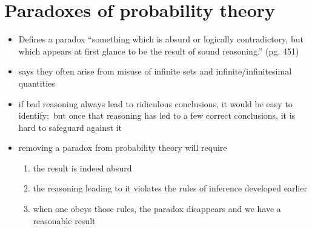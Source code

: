 \documentclass[../jaynes_prob_theory_notes.tex]{subfiles}
\begin{document}
    \section{Paradoxes of probability theory}
        \begin{itemize} 
            \item Defines a paradox ``something which is absurd or logically contradictory, but which appears at first glance to be the result of sound reasoning.'' (pg. 451)
            \item says they often arise from misuse of infinite sets and infinite/infinitesimal quantities
            \item if bad reasoning always lead to ridiculous conclusions, it would be easy to identify;\ but once that reasoning has led to a few correct conclusions, it is hard to safeguard against it
            \item removing a paradox from probability theory will require
                \begin{enumerate}
                    \item the result is indeed absurd
                    \item the reasoning leading to it violates the rules of inference developed earlier
                    \item when one obeys those rules, the paradox disappears and we have a reasonable result
                \end{enumerate}
        \end{itemize}
\end{document}
